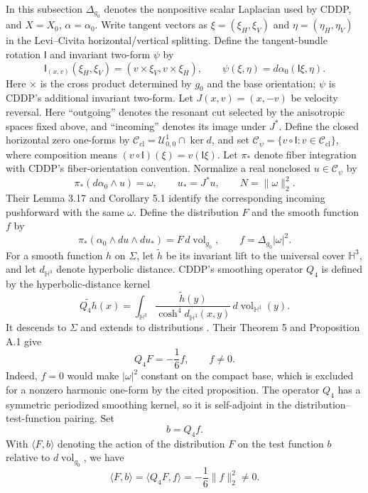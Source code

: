 \documentclass[11pt,letterpaper,reqno]{amsart}
\theoremstyle{remark}
\newcommand{\cU}{\mathcal U}
\begin{document}
In this subsection $\Delta_{g_0}$ denotes the nonpositive scalar
Laplacian used by CDDP, and $X=X_0$, $\alpha=\alpha_0$. Write tangent
vectors as $\xi=(\xi_H,\xi_V)$ and $\eta=(\eta_H,\eta_V)$ in the
Levi--Civita horizontal/vertical splitting. Define the tangent-bundle
rotation $\mathsf I$ and invariant two-form $\psi$ by
\[
 \mathsf I_{(x,v)}(\xi_H,\xi_V)
   =(v\times\xi_V,v\times\xi_H),\qquad
 \psi(\xi,\eta)=d\alpha_0(\mathsf I\xi,\eta).
\]
Here $\times$ is the cross product determined by $g_0$ and the base
orientation; $\psi$ is CDDP's additional invariant two-form.
Let $J(x,v)=(x,-v)$ be velocity reversal. Here ``outgoing'' denotes
the resonant cut selected by the anisotropic spaces fixed above,
and ``incoming'' denotes its image under $J^*$. Define the closed
horizontal zero one-forms by
$\mathcal C_{\mathrm{cl}}=\cU^1_{0,0}\cap\ker d$, and set
$\mathcal C_\psi=\{v\circ\mathsf I:v\in\mathcal C_{\mathrm{cl}}\}$,
where composition means $(v\circ\mathsf I)(\xi)=v(\mathsf I\xi)$.
Let $\pi_*$ denote fiber
integration with CDDP's fiber-orientation convention.
Normalize a real nonclosed $u\in\mathcal C_\psi$ by
\begin{equation}\label{app:unormalization}
 \pi_*(d\alpha_0\wedge u)=\omega,
 \qquad u_*=J^*u,
 \qquad N=\|\omega\|_2^2.
\end{equation}
Their Lemma 3.17 and Corollary 5.1 identify the corresponding
incoming pushforward with the same $\omega$. Define the distribution
$F$ and the smooth function $f$ by
\begin{equation}\label{app:Ff}
 \pi_*(\alpha_0\wedge du\wedge du_*)
   =F\,d\operatorname{vol}_{g_0},
 \qquad f=\Delta_{g_0}|\omega|^2.
\end{equation}
For a smooth function $h$ on $\Sigma$, let $\widetilde h$ be its
invariant lift to the universal cover $\mathbb H^3$, and let
$d_{\mathbb H^3}$ denote hyperbolic distance. CDDP's smoothing
operator $Q_4$ is defined by the hyperbolic-distance kernel
\begin{equation}\label{app:Q4definition}
 \widetilde{Q_4h}(x)
  =\int_{\mathbb H^3}
    \frac{\widetilde h(y)}{\cosh^4 d_{\mathbb H^3}(x,y)}
      \,d\operatorname{vol}_{\mathbb H^3}(y).
\end{equation}
It descends to $\Sigma$ and extends to distributions
\cite[\S5.1.2]{CDDP}. Their Theorem 5 and Proposition A.1 give
\begin{equation}\label{app:Q4identity}
 Q_4F=-\frac16f,\qquad f\ne0.
\end{equation}
Indeed, $f=0$ would make $|\omega|^2$ constant on the compact base,
which is excluded for a nonzero harmonic one-form by the cited
proposition. The operator $Q_4$ has a symmetric periodized smoothing
kernel, so it is self-adjoint in the distribution--test-function pairing.
Set
\begin{equation}\label{app:bchoice}
 b=Q_4f.
\end{equation}
With $\langle F,b\rangle$ denoting the action of the distribution $F$
on the test function $b$ relative to $d\operatorname{vol}_{g_0}$, we have
\begin{equation}\label{app:basepairing}
 \langle F,b\rangle
 =\langle Q_4F,f\rangle
 =-\frac16\|f\|_2^2\ne0.
\end{equation}
\end{document}
